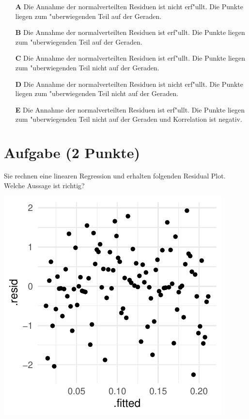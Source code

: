 \documentclass[a4paper, 10pt]{scrartcl}\usepackage[]{graphicx}\usepackage[]{xcolor}
\makeatletter
\def\maxwidth{ %
  \ifdim\Gin@nat@width>\linewidth
    \linewidth
  \else
    \Gin@nat@width
  \fi
}
\makeatother
\begin{document}
\begin{enumerate}
\item [\textbf{A} \msquare] Die Annahme der normalverteilten Residuen ist nicht erf{"u}llt. Die Punkte liegen zum {"u}berwiegenden Teil auf der Geraden.
\item [\textbf{B} \msquare] Die Annahme der normalverteilten Residuen ist erf{"u}llt. Die Punkte liegen zum {"u}berwiegenden Teil auf der Geraden.
\item [\textbf{C} \msquare] Die Annahme der normalverteilten Residuen ist erf{"u}llt. Die Punkte liegen zum {"u}berwiegenden Teil nicht auf der Geraden.
\item [\textbf{D} \msquare] Die Annahme der normalverteilten Residuen ist nicht erf{"u}llt. Die Punkte liegen zum {"u}berwiegenden Teil nicht auf der Geraden.
\item [\textbf{E} \msquare] Die Annahme der normalverteilten Residuen ist erf{"u}llt. Die Punkte liegen zum {"u}berwiegenden Teil nicht auf der Geraden und Korrelation ist negativ.
\end{enumerate}

\section{Aufgabe \hfill (2 Punkte)}

Sie rechnen eine linearen Regression und erhalten folgenden Residual
Plot. Welche Aussage ist richtig?




{\centering \includegraphics[width=\maxwidth]{img/mc-regression-06-a-1} 

}
\end{document}
